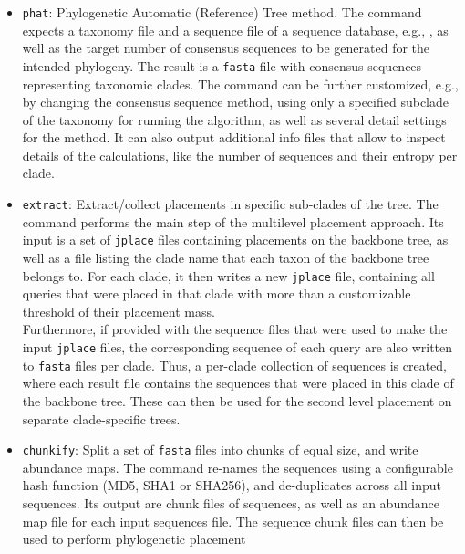 \begin{itemize}
    \item \texttt{phat}: Phylogenetic Automatic (Reference) Tree method.
          The command expects a taxonomy file and a sequence file of a sequence database,
          e.g.,  \citep{Quast2013,Yilmaz2014},
          as well as the target number of consensus sequences to be generated for the intended phylogeny.
          The result is a \texttt{fasta} file with consensus sequences representing taxonomic clades.
          The command can be further customized, e.g., by changing the consensus sequence method,
          using only a specified subclade of the taxonomy for running the algorithm,
          as well as several detail settings for the method.
          It can also output additional info files that allow to inspect details of the calculations,
          like the number of sequences and their entropy per clade.
    \item \texttt{extract}: Extract/collect placements in specific sub-clades of the tree.
          The command performs the main step of the multilevel placement approach.
          Its input is a set of \texttt{jplace} files containing placements on the backbone tree,
          as well as a file listing the clade name that each taxon of the backbone tree belongs to.
          For each clade, it then writes a new \texttt{jplace} file,
          containing all queries that were placed in that clade with more than a customizable threshold
          of their placement mass.
          \\
          Furthermore, if provided with the sequence files that were used to make the input \texttt{jplace} files,
          the corresponding sequence of each query are also written to \texttt{fasta} files per clade.
          Thus, a per-clade collection of sequences is created, where each result file contains the sequences
          that were placed in this clade of the backbone tree.
          These can then be used for the second level placement on separate clade-specific trees.
    \item \texttt{chunkify}: Split a set of \texttt{fasta} files into chunks of equal size,
          and write abundance maps.
          The command re-names the sequences using a configurable hash function (MD5, SHA1 or SHA256),
          and de-duplicates across all input sequences.
          Its output are chunk files of sequences, as well as an abundance map file for each input sequences file.
          The sequence chunk files can then be used to perform phylogenetic placement

\end{itemize}
